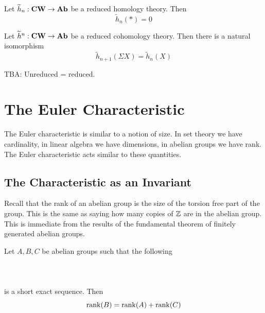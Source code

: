 \documentclass[a4paper]{article}
\begin{document}
\begin{lmm}{}{} Let $\widetilde{h}_n:\bold{CW}\to\bold{Ab}$ be a reduced homology theory. Then $$\widetilde{h}_n(\ast)=0$$
\end{lmm}

\begin{prp}{}{} Let $\widetilde{h}^n:\bold{CW}\to\bold{Ab}$ be a reduced cohomology theory. Then there is a natural isomorphism $$\widetilde{h}_{n+1}(\Sigma X)=\widetilde{h}_n(X)$$
\end{prp}

TBA: Unreduced = reduced. 


\pagebreak
\section{The Euler Characteristic}
The Euler characteristic is similar to a notion of size. In set theory we have cardinality, in linear algebra we have dimensions, in abelian groups we have rank. The Euler characteristic acts similar to these quantities. 

\subsection{The Characteristic as an Invariant}
Recall that the rank of an abelian group is the size of the torsion free part of the group. This is the same as saying how many copies of $\mathbb{Z}$ are in the abelian group. This is immediate from the results of the fundamental theorem of finitely generated abelian groups. 

\begin{lmm}{}{} Let $A,B,C$ be abelian groups such that the following \\~\\
\\~\\
is a short exact sequence. Then $$\rank(B)=\rank(A)+\rank(C)$$
\end{lmm}
\end{document}
